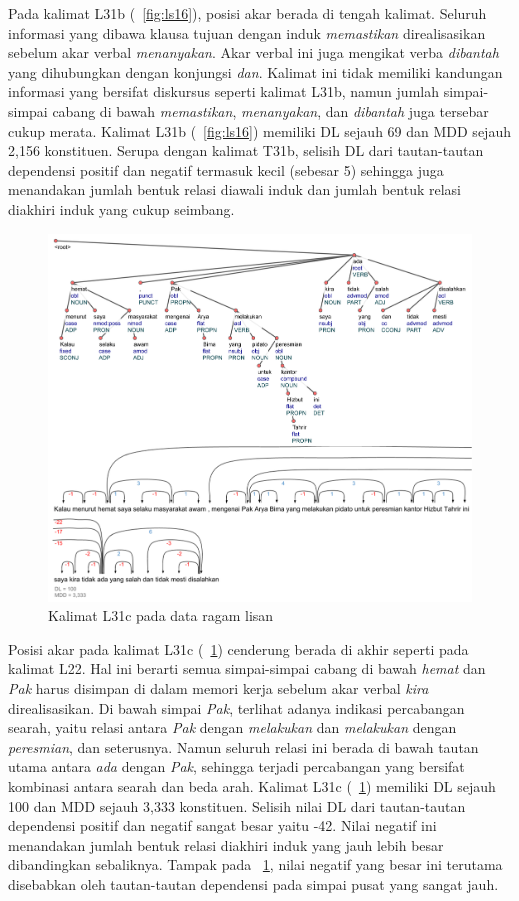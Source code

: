 Pada kalimat L31b (\pic~\ref{fig:ls16}), posisi akar berada di tengah kalimat. Seluruh informasi yang dibawa klausa tujuan dengan induk \textit{memastikan} direalisasikan sebelum akar verbal \textit{menanyakan}. Akar verbal ini juga mengikat verba \textit{dibantah} yang dihubungkan dengan konjungsi \textit{dan}. Kalimat ini tidak memiliki kandungan informasi yang bersifat diskursus seperti kalimat L31b, namun jumlah simpai-simpai cabang di bawah \textit{memastikan}, \textit{menanyakan}, dan \textit{dibantah} juga tersebar cukup merata. Kalimat L31b (\pic~\ref{fig:ls16}) memiliki DL sejauh 69 dan MDD sejauh 2,156 konstituen. Serupa dengan kalimat T31b, selisih DL dari tautan-tautan dependensi positif dan negatif termasuk kecil (sebesar 5) sehingga juga menandakan jumlah bentuk relasi diawali induk dan jumlah bentuk relasi diakhiri induk yang cukup seimbang. 

\begin{figure}
	\centering \includegraphics[width=1
	\textwidth] {pics/ls114.jpg} 
	\caption{Kalimat L31c pada data ragam lisan}
	\label{fig:ls114} 
\end{figure}

Posisi akar pada kalimat L31c (\pic~\ref{fig:ls114}) cenderung berada di akhir seperti pada kalimat L22. Hal ini berarti semua simpai-simpai cabang di bawah \textit{hemat} dan \textit{Pak} harus disimpan di dalam memori kerja sebelum akar verbal \textit{kira} direalisasikan. Di bawah simpai \textit{Pak}, terlihat adanya indikasi percabangan searah, yaitu relasi antara \textit{Pak} dengan \textit{melakukan} dan \textit{melakukan} dengan \textit{peresmian}, dan seterusnya. Namun seluruh relasi ini berada di bawah tautan utama antara \textit{ada} dengan \textit{Pak}, sehingga terjadi percabangan yang bersifat kombinasi antara searah dan beda arah. Kalimat L31c (\pic~\ref{fig:ls114}) memiliki DL sejauh 100 dan MDD sejauh 3,333 konstituen. Selisih nilai DL dari tautan-tautan dependensi positif dan negatif sangat besar yaitu -42. Nilai negatif ini menandakan jumlah bentuk relasi diakhiri induk yang jauh lebih besar dibandingkan sebaliknya. Tampak pada \pic~\ref{fig:ls114}, nilai negatif yang besar ini terutama disebabkan oleh tautan-tautan dependensi pada simpai pusat yang sangat jauh.

